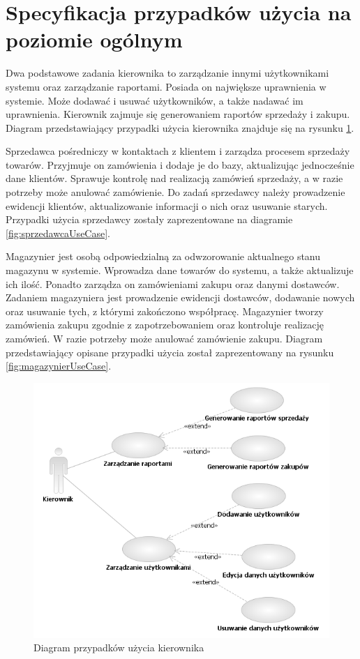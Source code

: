 \section{Specyfikacja przypadków użycia na poziomie ogólnym}

Dwa podstawowe zadania kierownika to zarządzanie innymi użytkownikami 
systemu oraz zarządzanie raportami. Posiada on największe 
uprawnienia w systemie. Może dodawać i usuwać użytkowników, a 
także nadawać im uprawnienia. Kierownik zajmuje się 
generowaniem raportów sprzedaży i zakupu.
Diagram przedstawiający przypadki użycia kierownika znajduje się na rysunku
\ref{fig:kierownikUseCase}.

Sprzedawca pośredniczy w kontaktach z klientem i zarządza procesem 
sprzedaży towarów. Przyjmuje on zamówienia i dodaje je do bazy, 
aktualizując jednocześnie dane klientów. Sprawuje kontrolę nad 
realizacją zamówień sprzedaży, a w razie potrzeby może anulować zamówienie. 
Do zadań sprzedawcy należy prowadzenie ewidencji klientów, aktualizowanie 
informacji o nich oraz usuwanie starych. Przypadki użycia sprzedawcy zostały
zaprezentowane na diagramie \ref{fig:sprzedawcaUseCase}.  

Magazynier jest osobą odpowiedzialną za odwzorowanie aktualnego stanu magazynu 
w systemie. Wprowadza dane towarów do systemu, a także aktualizuje ich 
ilość. Ponadto zarządza on zamówieniami zakupu oraz danymi dostawców. 
Zadaniem magazyniera jest prowadzenie ewidencji dostawców, dodawanie nowych 
oraz usuwanie tych, z którymi zakończono współpracę. Magazynier tworzy
zamówienia zakupu zgodnie z zapotrzebowaniem oraz kontroluje realizację zamówień. W razie 
potrzeby może anulować zamówienie zakupu. Diagram przedstawiający opisane
przypadki użycia został zaprezentowany na rysunku \ref{fig:magazynierUseCase}.

\begin{figure}[ht]
    \begin{center}
    \includegraphics[angle=-90,scale=0.8]{../img/kierownikUseCase.png}
    \end{center}
    \caption{Diagram przypadków użycia kierownika}
    \label{fig:kierownikUseCase}
\end{figure}


